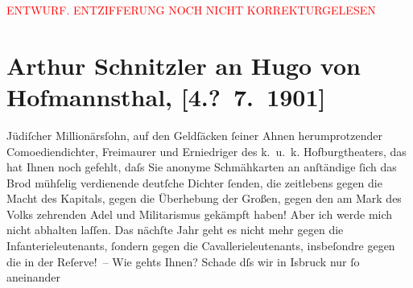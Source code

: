
\begin{center}
            \textcolor{red}{ENTWURF. ENTZIFFERUNG NOCH NICHT KORREKTURGELESEN}
                      \end{center}
            
               \section[Arthur Schnitzler an Hugo von Hofmannsthal, {[}4.? 7. 1901{]}]{ Arthur Schnitzler an Hugo von Hofmannsthal, {[}4.? 7. 1901{]}}\nopagebreak{}\rehead{ }\begin{ledgroupsized}[t]{13cm}\normalsize\beginnumbering{} \toendnotes[C]{\smallbreak\pagebreak[2]} 
\toendnotes[C]{\smallbreak}\pstart
           \noindent{}{\pb}Jüdiſcher Millionärsſohn, auf den Geldſäcken ſeiner Ahnen
               herumprotzender Comoediendichter, Freimaurer und Erniedriger des k. u. k. Hofburgtheaters, das hat Ihnen noch gefehlt, daſs Sie
               anonyme Schmähkarten an anſtändige ſich das Brod mühſelig verdienende deutſche
               Dichter ſenden, die zeitlebens gegen die Macht des Kapitals, gegen die Über{\pb}hebung der Großen, gegen den am Mark des Volks zehrenden
               Adel und Militarismus gekämpft haben! Aber ich werde mich nicht abhalten laſſen. Das
               nächſte Jahr geht es nicht mehr gegen die Infanterieleutenants, ſondern gegen die
               Cavallerieleutenants, insbeſondre gegen die in der Reſerve! –\pend
           \pstart
           Wie gehts Ihnen? Schade dſs {\pb}wir in I{\geminationn}sbruck nur ſo aneinander

\end{ledgroupsized}
